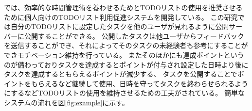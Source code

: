 \cite{report} では、効率的な時間管理術を養わせるためとTODOリストの使用を推奨させるために個人向けのTODOリスト利用促進システムを開発している。
この研究では自分のTODOリストに設定したタスクを他のユーザが見れるように公開サーバーに公開することができる。
公開したタスクは他ユーザからフィードバックを送信することができ、それによってそのタスクの未経験者も参考にすることができモチベーション維持を行っている。
またそのほかにも達成ポイントというのが備わっておりタスクを達成するとポイントが付与され設定した日時より後にタスクを達成するともらえるポイントが減少する、
タスクを公開することでポイントをもらえるなど継続して使用、日時を守ってタスクを終わらせられるようにするなどTODOリストの使用を維持させるための工夫がされている。
簡単なシステムの流れを図\ref{fig:example}に示す。
